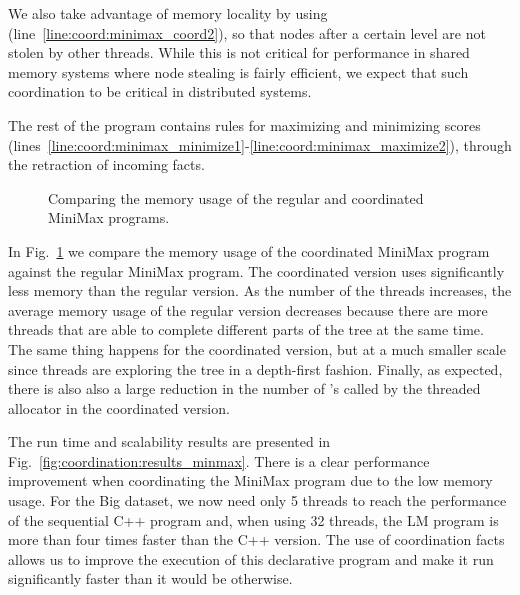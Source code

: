 We also take advantage of memory locality by using 
(line~\ref{line:coord:minimax_coord2}), so that nodes after a certain level are
   not stolen by other threads. While this is not critical for performance in
   shared memory systems where node stealing is fairly efficient, we expect that
   such coordination to be critical in distributed systems.

The rest of the program contains rules for maximizing and minimizing scores
(lines~\ref{line:coord:minimax_minimize1}-\ref{line:coord:minimax_maximize2}),
through the retraction of  incoming facts.

\begin{figure}[ht]
   \begin{center}
      
   \end{center}

   \caption{Comparing the memory usage of the regular and coordinated MiniMax
   programs.}
   \label{results:memory_minmax}
\end{figure}

In Fig.~\ref{results:memory_minmax} we compare the memory usage of the
coordinated MiniMax program against the regular MiniMax program. The coordinated
version uses significantly less memory than the regular version. As the number
of the threads increases, the average memory usage of the regular version
decreases because there are more threads that are able to complete different
parts of the tree at the same time. The same thing happens for the coordinated
version, but at a much smaller scale since threads are exploring the tree in a
depth-first fashion. Finally, as expected, there is also also a large reduction
in the number of 's called by the threaded allocator in the
coordinated version.

The run time and scalability results are presented in
Fig.~\ref{fig:coordination:results_minmax}. There is a clear performance
improvement when coordinating the MiniMax program due to the low memory usage.
For the Big dataset, we now need only 5 threads to reach the performance of the
sequential C++ program and, when using 32 threads, the LM program is more than
four times faster than the C++ version. The use of coordination facts allows us
to improve the execution of this declarative program and make it run
significantly faster than it would be otherwise.

